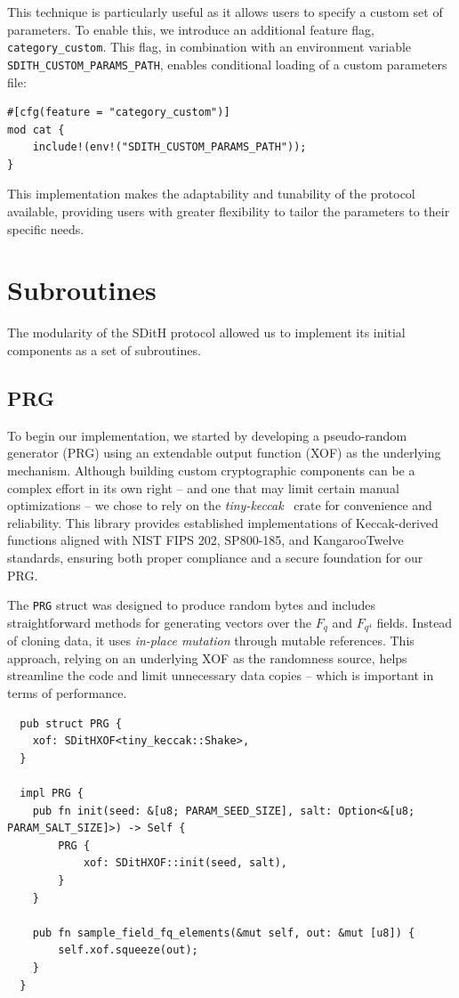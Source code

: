 \documentclass[11pt]{report}
\theoremstyle{definition}
\theoremstyle{plain}
\begin{document}
This technique is particularly useful as it allows users to specify a custom set of parameters. To enable this, we introduce an additional feature flag, \texttt{category\_custom}. This flag, in combination with an environment variable \texttt{SDITH\_CUSTOM\_PARAMS\_PATH}, enables conditional loading of a custom parameters file:

\begin{verbatim}
#[cfg(feature = "category_custom")]
mod cat {
    include!(env!("SDITH_CUSTOM_PARAMS_PATH"));
}
\end{verbatim}

This implementation makes the adaptability and tunability of the protocol available, providing users with greater flexibility to tailor the parameters to their specific needs.

\section{Subroutines}\label{sub:subroutines}
The modularity of the SDitH protocol allowed us to implement its initial components as a set of subroutines.

\subsection{PRG}\label{sub:prg}
To begin our implementation, we started by developing a pseudo-random generator (PRG) using an extendable output function (XOF) as the underlying mechanism. Although building custom cryptographic components can be a complex effort in its own right -- and one that may limit certain manual optimizations -- we chose to rely on the \textit{tiny-keccak}~\cite{tinykeccak} crate for convenience and reliability. This library provides established implementations of Keccak-derived functions aligned with NIST FIPS 202, SP800-185, and KangarooTwelve standards, ensuring both proper compliance and a secure foundation for our PRG.

The \texttt{PRG} struct was designed to produce random bytes and includes straightforward methods for generating vectors over the $F_q$ and $F_{q^4}$ fields. Instead of cloning data, it uses \textit{in-place mutation} through mutable references. This approach, relying on an underlying XOF as the randomness source, helps streamline the code and limit unnecessary data copies -- which is important in terms of performance.

\begin{verbatim}
  pub struct PRG {
    xof: SDitHXOF<tiny_keccak::Shake>,
  }

  impl PRG {
    pub fn init(seed: &[u8; PARAM_SEED_SIZE], salt: Option<&[u8; PARAM_SALT_SIZE]>) -> Self {
        PRG {
            xof: SDitHXOF::init(seed, salt),
        }
    }

    pub fn sample_field_fq_elements(&mut self, out: &mut [u8]) {
        self.xof.squeeze(out);
    }
  }
\end{verbatim}
\end{document}
